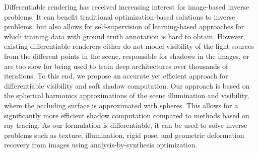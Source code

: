 %
Differentiable rendering has received increasing interest for image-based inverse problems. 
%
It can benefit traditional optimization-based solutions to inverse problems, but also allows for self-supervision of learning-based approaches for which training data with ground truth annotation is hard to obtain.
%
However, existing differentiable renderers either do not model visibility of the light sources from the different points in the scene, responsible for shadows in the images, or are too slow for being used to train deep architectures over thousands of iterations.
%
To this end, we propose an accurate yet efficient approach for differentiable visibility and soft shadow computation. 
%
Our approach is based on the spherical harmonics approximations of the scene illumination and visibility, where the occluding surface is approximated with spheres.
%
This allows for a significantly more efficient shadow computation compared to methods based on ray tracing. 
%
As our formulation is differentiable, it can be used to solve inverse problems such as texture, illumination, rigid pose, and geometric deformation recovery from images using analysis-by-synthesis optimization.
%